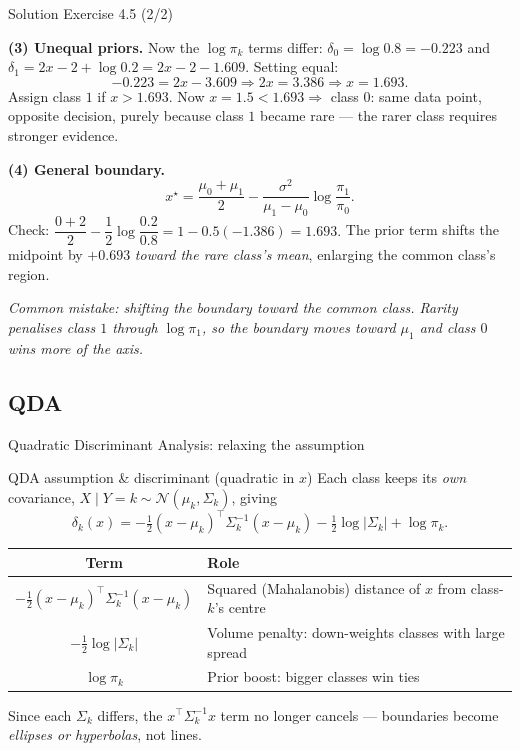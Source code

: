 \documentclass[aspectratio=169,11pt]{beamer}
\begin{document}
\begin{frame}{Solution \textemdash{} Exercise 4.5 (2/2)}
\begin{solutionbox}
\textbf{(3) Unequal priors.} Now the $\log\pi_k$ terms differ:
$\delta_0=\log 0.8=-0.223$ and $\delta_1=2x-2+\log 0.2=2x-2-1.609$.
Setting equal:
\[
  -0.223 = 2x - 3.609 \Rightarrow 2x = 3.386 \Rightarrow x = 1.693 .
\]
Assign class $1$ if $x>1.693$. Now $x=1.5<1.693 \Rightarrow$ class $0$:
same data point, opposite decision, purely because class $1$ became
rare --- the rarer class requires stronger evidence.

\vspace{1mm}
\textbf{(4) General boundary.}
\[
  x^\star = \frac{\mu_0+\mu_1}{2}
          - \frac{\sigma^2}{\mu_1-\mu_0}\log\frac{\pi_1}{\pi_0}.
\]
Check: $\dfrac{0+2}{2}-\dfrac{1}{2}\log\dfrac{0.2}{0.8}
= 1 - 0.5(-1.386) = 1.693.$ \checkmark\quad
The prior term shifts the midpoint by $+0.693$ \emph{toward the rare
class's mean}, enlarging the common class's region.

\vspace{1mm}
\emph{Common mistake: shifting the boundary toward the \emph{common}
class. Rarity penalises class $1$ through $\log\pi_1$, so the boundary
moves toward $\mu_1$ and class $0$ wins more of the axis.}
\end{solutionbox}
\end{frame}

\subsection{QDA}

\begin{frame}{Quadratic Discriminant Analysis: relaxing the assumption}
  \begin{block}{QDA assumption \& discriminant (quadratic in $x$)}
    Each class keeps its \emph{own} covariance,
    $X \mid Y = k \sim \mathcal{N}(\mu_k, \Sigma_k)$, giving
    \[
      \boxed{\;
      \delta_k(x) = -\tfrac12 (x - \mu_k)^\top \Sigma_k^{-1}(x - \mu_k)
         - \tfrac12 \log|\Sigma_k| + \log \pi_k. \;}
    \]
  \end{block}
  \begin{readme}
    \begin{tabular}{@{}cl@{}}
      \toprule
      \textbf{Term} & \textbf{Role} \\
      \midrule
      $-\tfrac12 (x-\mu_k)^\top \Sigma_k^{-1}(x-\mu_k)$
        & Squared (Mahalanobis) distance of $x$ from class-$k$'s centre \\
      $-\tfrac12 \log|\Sigma_k|$
        & Volume penalty: down-weights classes with large spread \\
      $\log \pi_k$ & Prior boost: bigger classes win ties \\
      \bottomrule
    \end{tabular}
  \end{readme}
  Since each $\Sigma_k$ differs, the $x^\top \Sigma_k^{-1} x$ term no
  longer cancels --- boundaries become \emph{ellipses or hyperbolas},
  not lines.
\end{frame}
\end{document}
